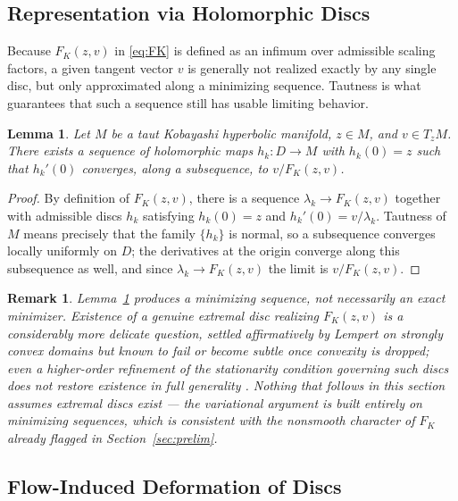 \documentclass[preprint,12pt,authoryear]{elsarticle}
\newtheorem{lemma}{Lemma} %
\newtheorem{remark}{Remark}
\newtheorem{proof}{Proof}
\begin{document}
\subsection{Representation via Holomorphic Discs}

Because $F_K(z,v)$ in \eqref{eq:FK} is defined as an infimum over admissible scaling factors, a given tangent vector $v$ is generally not realized exactly by any single disc, but only approximated along a minimizing sequence. Tautness is what guarantees that such a sequence still has usable limiting behavior.

\begin{lemma}
\label{lem:discrep}
Let $M$ be a taut Kobayashi hyperbolic manifold, $z\in M$, and $v\in T_zM$. There exists a sequence of holomorphic maps $h_k:D\to M$ with $h_k(0)=z$ such that $h_k'(0)$ converges, along a subsequence, to $v/F_K(z,v)$.
\end{lemma}

\begin{proof}
By definition of $F_K(z,v)$, there is a sequence $\lambda_k\to F_K(z,v)$ together with admissible discs $h_k$ satisfying $h_k(0)=z$ and $h_k'(0)=v/\lambda_k$. Tautness of $M$ means precisely that the family $\{h_k\}$ is normal, so a subsequence converges locally uniformly on $D$; the derivatives at the origin converge along this subsequence as well, and since $\lambda_k\to F_K(z,v)$ the limit is $v/F_K(z,v)$.
\end{proof}

\begin{remark}
\label{rem:noextremal}
Lemma~\ref{lem:discrep} produces a minimizing sequence, not necessarily an exact minimizer. Existence of a genuine extremal disc realizing $F_K(z,v)$ is a considerably more delicate question, settled affirmatively by Lempert on strongly convex domains but known to fail or become subtle once convexity is dropped; even a higher-order refinement of the stationarity condition governing such discs does not restore existence in full generality \cite{bertrand2018extremal}. Nothing that follows in this section assumes extremal discs exist — the variational argument is built entirely on minimizing sequences, which is consistent with the nonsmooth character of $F_K$ already flagged in Section~\ref{sec:prelim}.
\end{remark}

\subsection{Flow-Induced Deformation of Discs}
\end{document}
